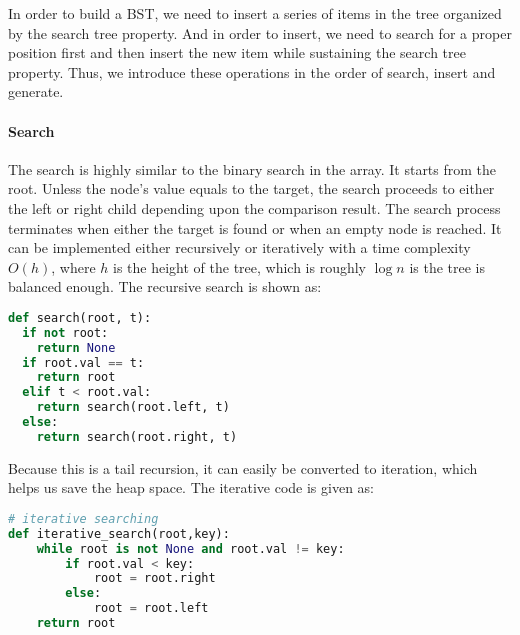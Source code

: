 \documentclass[main.tex]{subfiles}
\begin{document}

In order to build a BST, we need to insert a series of items in the tree organized by the search tree property. And in order to insert, we need to search for a proper position first and then insert the new item while sustaining the search tree property. Thus, we introduce these operations in the order of search, insert and generate. 

\paragraph{Search}

The search is highly similar to the binary search in the array. It starts from the root. Unless the node's value equals to the target, the search proceeds to either the left or right child depending upon the comparison result. The search process terminates when either the target is found or when an empty node is reached. It can be implemented either recursively or iteratively with a time complexity $O(h)$, where $h$ is the height of the tree, which is roughly $\log n$ is the tree is balanced enough. The recursive search is shown as:
\begin{lstlisting}[language = Python]
def search(root, t):
  if not root:
    return None
  if root.val == t:
    return root
  elif t < root.val:
    return search(root.left, t)
  else:
    return search(root.right, t)
\end{lstlisting}
Because this is a tail recursion, it can easily be converted to iteration,  which helps us save the heap space. The iterative code is given as:
\begin{lstlisting}[language = Python]
# iterative searching
def iterative_search(root,key):
    while root is not None and root.val != key:
        if root.val < key:
            root = root.right
        else:
            root = root.left
    return root
\end{lstlisting}
\end{document}
